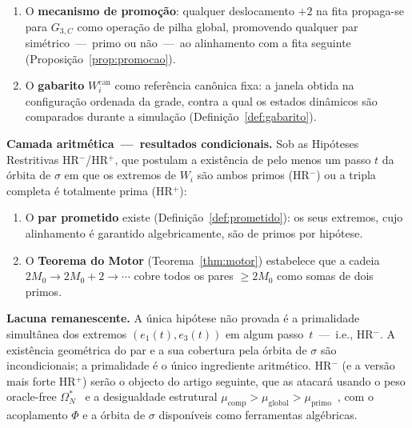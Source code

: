 \documentclass[12pt, a4paper]{article}
\theoremstyle{plain}
\theoremstyle{definition}
\theoremstyle{remark}
\begin{document}
\begin{enumerate}
		movem-se em sentidos opostos ($e_1\!\uparrow$,
		$e_3\!\downarrow$), os extremos de $W_i$ apontam
		exactamente os pares diagonais $(a_{k+1},b_k^{(1)})$ com soma
		$2M^+$, e o passo unitário $\delta=1$ é a única escolha
		que mantém simultaneamente a cobertura bijectiva e a
		sincronização $N\to N{+}1$
		(Observação~\ref{rem:sigma-direcoes};
		Proposição~\ref{prop:pares-diagonais}).
		\item O \textbf{mecanismo de promoção}: qualquer deslocamento
		$+2$ na fita propaga-se para $G_{3,C}$ como operação de
		pilha global, promovendo qualquer par simétrico~---~primo
		ou não~---~ao alinhamento com a fita seguinte
		(Proposição~\ref{prop:promocao}).
		\item O \textbf{gabarito} $W_i^{\text{can}}$ como referência
		canônica fixa: a janela obtida na configuração ordenada da grade,
		contra a qual os estados dinâmicos são comparados durante a
		simulação (Definição~\ref{def:gabarito}).
	\end{enumerate}
	
	\medskip
	\noindent\textbf{Camada aritmética~---~resultados condicionais.}
	Sob as Hipóteses Restritivas HR$^-$/HR$^+$, que postulam a
	existência de pelo menos um passo $t$ da órbita de $\sigma$ em que
	os extremos de $W_i$ são ambos primos (HR$^-$) ou a tripla
	completa é totalmente prima (HR$^+$):
	\begin{enumerate}
		\item O \textbf{par prometido} existe
		(Definição~\ref{def:prometido}): os seus extremos, cujo
		alinhamento é garantido algebricamente, são de primos por
		hipótese.
		\item O \textbf{Teorema do Motor}
		(Teorema~\ref{thm:motor}) estabelece que a cadeia
		$2M_0\to2M_0+2\to\cdots$ cobre todos os pares $\geq 2M_0$
		como somas de dois primos.
	\end{enumerate}
	
	\medskip
	\noindent\textbf{Lacuna remanescente.}
	A única hipótese não provada é a primalidade simultânea dos
	extremos $(e_1(t),e_3(t))$ em algum passo~$t$~---~i.e., HR$^-$.
	A existência geométrica do par e a sua cobertura pela órbita de
	$\sigma$ são incondicionais; a primalidade é o único ingrediente
	aritmético.  HR$^-$ (e a versão mais forte HR$^+$) serão o objecto
	do artigo seguinte, que as atacará usando o peso oracle-free
	$\Omega_N^*$~\cite{peso} e a desigualdade estrutural
	$\mu_{\text{comp}}>\mu_{\text{global}}>\mu_{\text{primo}}$~\cite{problemaB},
	com o acoplamento $\Phi$ e a órbita de $\sigma$ disponíveis como
	ferramentas algébricas.
	
\end{document}
